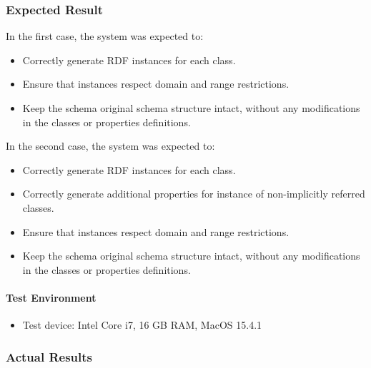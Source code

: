 \subsubsection{Expected Result}

In the first case, the system was expected to:
\begin{itemize}
    \item Correctly generate RDF instances for each class.
    \item Ensure that instances respect domain and range restrictions.
    \item Keep the schema original schema structure intact, without any modifications in the classes or properties definitions.
\end{itemize}

In the second case, the system was expected to:
\begin{itemize}
    \item Correctly generate RDF instances for each class.
    \item Correctly generate additional properties for instance of non-implicitly referred classes. 
    \item Ensure that instances respect domain and range restrictions.
    \item Keep the schema original schema structure intact, without any modifications in the classes or properties definitions.
\end{itemize}


\paragraph{Test Environment}
\begin{itemize}
    \item Test device: Intel Core i7, 16 GB RAM, MacOS 15.4.1 
\end{itemize}

\subsubsection{Actual Results}

